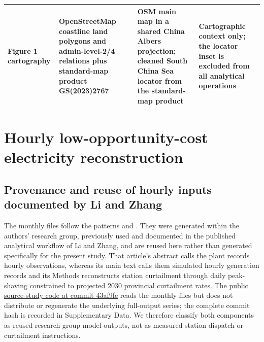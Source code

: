 \documentclass[11pt,a4paper]{article}
\begin{document}
\begin{table}[t]
\begin{tabularx}{\textwidth}{>{\raggedright\arraybackslash}p{}>{\raggedright\arraybackslash}p{}>{\raggedright\arraybackslash}X>{\raggedright\arraybackslash}p{}}
Figure 1 cartography & OpenStreetMap coastline land polygons and admin-level-2/4 relations plus standard-map product GS(2023)2767\cite{osmcoast,mnrmap2023} & OSM main map in a shared China Albers projection; cleaned South China Sea locator from the standard-map product & Cartographic context only; the locator inset is excluded from all analytical operations \\
\bottomrule
\end{tabularx}
\end{table}

\section{Hourly low-opportunity-cost electricity reconstruction}\label{sec:hourly}

\subsection{Provenance and reuse of hourly inputs documented by Li and Zhang}

The monthly files follow the patterns  and . They were generated within the authors' research group, previously used and documented in the published analytical workflow of Li and Zhang\cite{li2026}, and are reused here rather than generated specifically for the present study. That article's abstract calls the plant records hourly observations, whereas its main text calls them simulated hourly generation records and its Methods reconstructs station curtailment through daily peak-shaving constrained to projected 2030 provincial curtailment rates. The \href{https://github.com/Lynn20001130/-hydrogen-blending-analysis/tree/43af9fef041a7c55ca154cc6a40c5d339c23c521}{public source-study code at commit 43af9fe} reads the monthly files but does not distribute or regenerate the underlying full-output series; the complete commit hash is recorded in Supplementary Data. We therefore classify both components as reused research-group model outputs, not as measured station dispatch or curtailment instructions.
\end{document}
